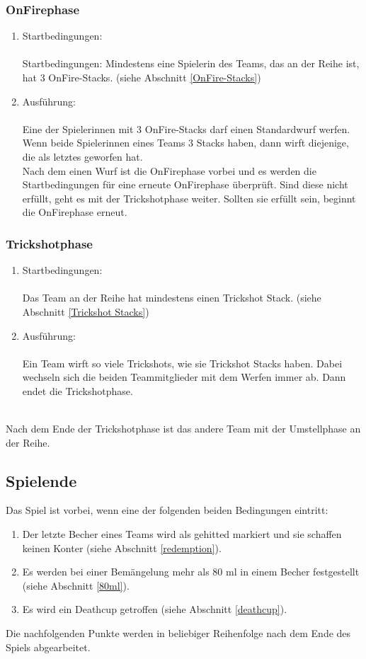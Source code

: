 \documentclass[a5paper, 12pt]{book}
\begin{document}
\subsubsection{OnFirephase}\label{onfirephase}
\begin{enumerate} [(1)]
    \item Startbedingungen:\\\\
    Startbedingungen: Mindestens eine Spielerin des Teams, das an der Reihe ist, hat 3 OnFire-Stacks. (siehe Abschnitt \ref{OnFire-Stacks})
    \item Ausführung:\\\\
    Eine der Spielerinnen mit 3 OnFire-Stacks darf 
 einen Standardwurf werfen. Wenn beide Spielerinnen eines Teams 3 Stacks haben, dann wirft diejenige, die als letztes geworfen hat. \\
Nach dem einen Wurf ist die OnFirephase vorbei und es werden die Startbedingungen für eine erneute OnFirephase überprüft. Sind diese nicht erfüllt, geht es mit der Trickshotphase weiter. Sollten sie erfüllt sein, beginnt die OnFirephase erneut.


\end{enumerate}
\subsubsection{Trickshotphase}\label{Trickshotphase}
\begin{enumerate} [(1)]
    \item Startbedingungen:\\\\
    Das Team an der Reihe hat mindestens einen Trickshot Stack. (siehe Abschnitt \ref{Trickshot Stacks})
    \item Ausführung:\\\\
    Ein Team wirft so viele Trickshots, wie sie Trickshot Stacks haben. Dabei wechseln sich die beiden Teammitglieder mit dem Werfen immer ab. Dann endet die Trickshotphase. \\\\
\end{enumerate}
Nach dem Ende der Trickshotphase ist das andere Team mit der Umstellphase an der Reihe.
\subsection{Spielende}\label{spielende}
Das Spiel ist vorbei, wenn eine der folgenden beiden Bedingungen eintritt:
\begin{enumerate}[(1)]
    \item Der letzte Becher eines Teams wird als gehitted markiert und sie schaffen keinen Konter (siehe Abschnitt \ref{redemption}).
    \item Es werden bei einer Bemängelung mehr als 80 ml in einem Becher festgestellt (siehe Abschnitt \ref{80ml}).
    \item Es wird ein Deathcup getroffen (siehe Abschnitt \ref{deathcup}).
\end{enumerate}
Die nachfolgenden Punkte werden in beliebiger Reihenfolge nach dem Ende des Spiels abgearbeitet.
\end{document}
